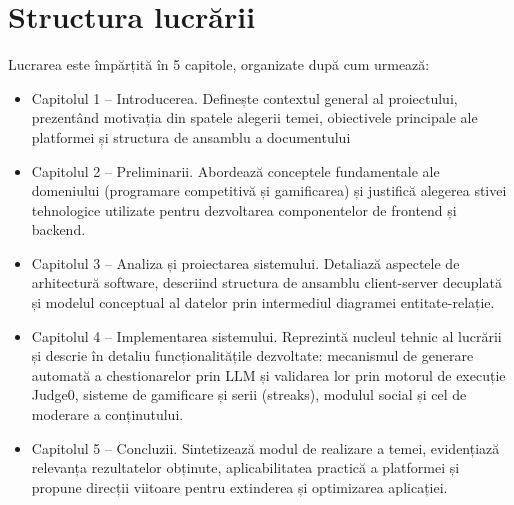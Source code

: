 \section{Structura lucrării}

Lucrarea este împărțită în 5 capitole, organizate după cum urmează:
\begin{itemize}
    \item Capitolul 1 – Introducerea. Definește contextul general al proiectului, prezentând motivația din spatele alegerii temei, obiectivele principale ale platformei și structura de ansamblu a documentului 
    \item Capitolul 2 – Preliminarii. Abordează conceptele fundamentale ale domeniului (programare competitivă și gamificarea) și justifică alegerea stivei tehnologice utilizate pentru dezvoltarea componentelor de frontend și backend. 
    \item Capitolul 3 – Analiza și proiectarea sistemului. Detaliază aspectele de arhitectură software, descriind structura de ansamblu client-server decuplată și modelul conceptual al datelor prin intermediul diagramei entitate-relație. 
    \item Capitolul 4 – Implementarea sistemului. Reprezintă nucleul tehnic al lucrării și descrie în detaliu funcționalitățile dezvoltate: mecanismul de generare automată a chestionarelor prin LLM și validarea lor prin motorul de execuție Judge0, sisteme de gamificare și serii (streaks), modulul social și cel de moderare a conținutului.
    \item Capitolul 5 – Concluzii. Sintetizează modul de realizare a temei, evidențiază relevanța rezultatelor obținute, aplicabilitatea practică a platformei și propune direcții viitoare pentru extinderea și optimizarea aplicației. 
\end{itemize}